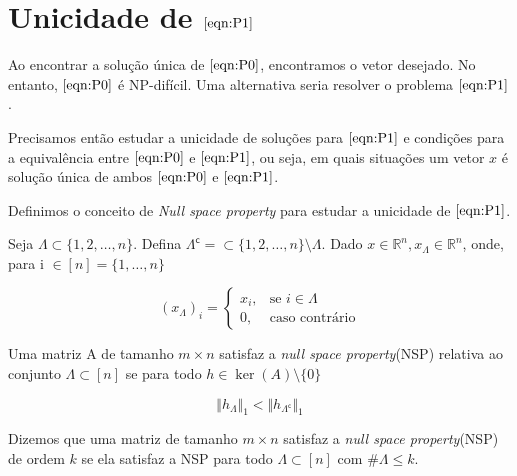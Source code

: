\section{Unicidade de $\eqref{eqn:P1}$}

Ao encontrar a solução única de $\eqref{eqn:P0}$, encontramos o vetor desejado. No entanto, $\eqref{eqn:P0}$ é NP-difícil. Uma alternativa seria resolver o problema $\eqref{eqn:P1}$.

Precisamos então estudar a unicidade de soluções para $\eqref{eqn:P1}$ e condições para a equivalência entre $\eqref{eqn:P0}$ e $\eqref{eqn:P1}$, ou seja, em quais situações um vetor $x$ é solução única de ambos $\eqref{eqn:P0}$ e $\eqref{eqn:P1}$.

Definimos o conceito de \textit{Null space property} para estudar a unicidade de $\eqref{eqn:P1}$.

\begin{definicao} Seja $\Lambda \subset \lbrace 1, 2, \hdots, n \rbrace$. Defina $\Lambda^{\mathsf{c}} = \subset \lbrace 1, 2, \hdots, n \rbrace \setminus \Lambda$. Dado $x \in \mathbb{R}^n, x_{\Lambda} \in \mathbb{R}^n$, onde, para i $\in [n] = \{1, \hdots, n\}$

$$(x_{\Lambda})_i = 
\begin{cases}
x_i, &\mbox{se } i \in \Lambda \\
0,   &\mbox{caso contrário}
\end{cases}$$

\end{definicao}

\begin{definicao} Uma matriz A de tamanho $m \times n$ satisfaz a \textit{null space property}(NSP) relativa ao conjunto $\Lambda \subset [n]$ se para todo $h \in \ker(A) \setminus \lbrace 0 \rbrace$


$$ \Vert h_{\Lambda} \Vert_1 <  \Vert h_{\Lambda^{\mathsf{c}}} \Vert_1$$
\end{definicao}

\begin{definicao}
Dizemos que uma matriz de tamanho $m \times n$ satisfaz a \textit{null space property}(NSP) de ordem $k$ se ela satisfaz a NSP para todo $\Lambda \subset [n]$ com $\# \Lambda \leq k$.
\end{definicao}

